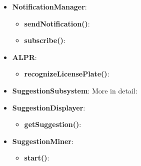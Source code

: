 \documentclass{article}
\begin{document}
\begin{itemize}
\begin{itemize}
		\end{itemize}
	\item \textbf{NotificationManager}:
		\begin{itemize}
			\item \textbf{sendNotification()}:
			\item \textbf{subscribe()}:
		\end{itemize}
	\item \textbf{ALPR}:
		\begin{itemize}
			\item \textbf{recognizeLicensePlate()}:
		\end{itemize}
	\item \textbf{SuggestionSubsystem}: More in detail:
	\item \textbf{SuggestionDisplayer}:
		\begin{itemize}
			\item \textbf{getSuggestion()}:
		\end{itemize}
	\item \textbf{SuggestionMiner}:
		\begin{itemize}
			\item \textbf{start()}:
		\end{itemize}
\end{itemize}

\newpage
\end{document}

